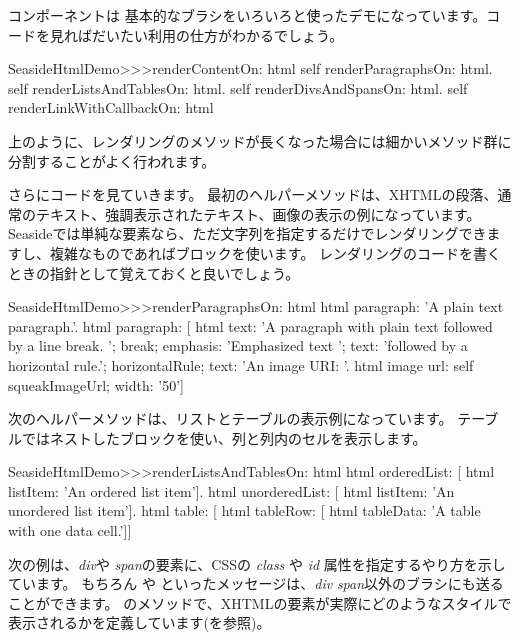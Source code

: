 \documentclass[a4paper,10pt,twoside]{book}
\begin{document}
コンポーネントは 基本的なブラシをいろいろと使ったデモになっています。コードを見ればだいたい利用の仕方がわかるでしょう。

\begin{code}{}
SeasideHtmlDemo>>>renderContentOn: html 
	self renderParagraphsOn: html.
	self renderListsAndTablesOn: html.
	self renderDivsAndSpansOn: html.
	self renderLinkWithCallbackOn: html
\end{code}

上のように、レンダリングのメソッドが長くなった場合には細かいメソッド群に分割することがよく行われます。


さらにコードを見ていきます。
最初のヘルパーメソッドは、XHTMLの段落、通常のテキスト、強調表示されたテキスト、画像の表示の例になっています。
Seasideでは単純な要素なら、ただ文字列を指定するだけでレンダリングできますし、複雑なものであればブロックを使います。
レンダリングのコードを書くときの指針として覚えておくと良いでしょう。

\begin{code}{}
SeasideHtmlDemo>>>renderParagraphsOn: html 
	html paragraph: 'A plain text paragraph.'.
	html paragraph: [
		html
			text: 'A paragraph with plain text followed by a line break. ';
			break;
			emphasis: 'Emphasized text ';
			text: 'followed by a horizontal rule.';
			horizontalRule;
			text: 'An image URI: '.
		html image
			url: self squeakImageUrl;
			width: '50']
\end{code}

次のヘルパーメソッドは、リストとテーブルの表示例になっています。 
テーブルではネストしたブロックを使い、列と列内のセルを表示します。

\begin{code}{}
SeasideHtmlDemo>>>renderListsAndTablesOn: html 
	html orderedList: [
		html listItem: 'An ordered list item'].
	html unorderedList: [
		html listItem: 'An unordered list item'].
	html table: [
		html tableRow: [
			html tableData: 'A table with one data cell.']]
\end{code}

次の例は、\emph{div}や \emph{span}の要素に、CSSの \emph{class} や \emph{id} 属性を指定するやり方を示しています。
もちろん  や  といったメッセージは、\emph{div} \emph{span}以外のブラシにも送ることができます。
 のメソッドで、XHTMLの要素が実際にどのようなスタイルで表示されるかを定義しています(を参照)。
\end{document}
